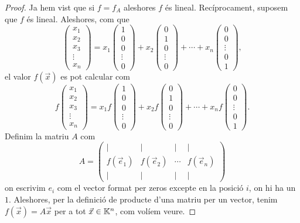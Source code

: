 \documentclass[
  11pt,
]{book}
\numberwithin{dummy}{section}
\theoremstyle{maincolornumbox}
\theoremstyle{blacknumex}
\theoremstyle{blacknumbox}
\theoremstyle{maincolornum}
\begin{document}
\begin{proof}
Ja hem vist que si \(f=f_A\) aleshores \(f\) és lineal.
Recíprocament, suposem que \(f\) és lineal. Aleshores, com que
\[\begin{pmatrix}
    x_1\\x_2\\x_3\\\vdots\\x_n
    \end{pmatrix}
    =x_1\begin{pmatrix}
    1\\0\\0\\\vdots\\0
    \end{pmatrix}
    +
    x_2\begin{pmatrix}
    0\\1\\0\\\vdots\\0
    \end{pmatrix}
    +\cdots+
    x_n
    \begin{pmatrix}
    0\\0\\\vdots\\0\\1
    \end{pmatrix},\] el valor \(f(\vec x)\) es pot calcular com
\[f\begin{pmatrix}
    x_1\\x_2\\x_3\\\vdots\\x_n
    \end{pmatrix}
    =x_1f\begin{pmatrix}
    1\\0\\0\\\vdots\\0
    \end{pmatrix}
    +
    x_2f\begin{pmatrix}
    0\\1\\0\\\vdots\\0
    \end{pmatrix}
    +\cdots+
    x_n
    f\begin{pmatrix}
    0\\0\\\vdots\\0\\1
    \end{pmatrix}.\] Definim la matriu \(A\) com \[A=\begin{pmatrix}
    \mid & \mid &\mid & \mid\\
    f(\vec e_1) & f(\vec e_2) &\cdots&f(\vec e_n)\\
    \mid & \mid &\mid & \mid
    \end{pmatrix}\] on escrivim \(e_i\) com el vector format per zeros excepte
en la posició \(i\), on hi ha un \(1\). Aleshores, per la definició de
producte d'una matriu per un vector, tenim \(f(\vec x) = A\vec x\) per a
tot \(\vec x\in \mathbb{K}^n\), com volíem veure.
\end{proof}
\end{document}
